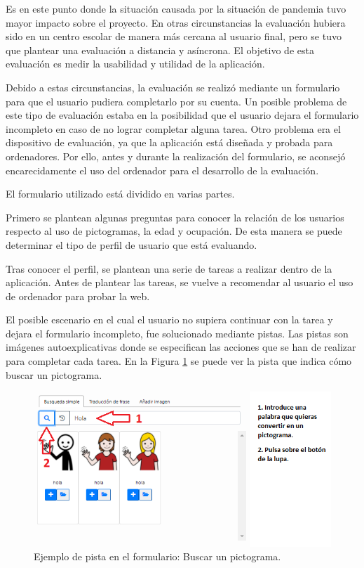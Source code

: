 Es en este punto donde la situación causada por la situación de pandemia tuvo mayor impacto sobre el proyecto. En otras circunstancias la evaluación hubiera sido en un centro escolar de manera más cercana al usuario final, pero se tuvo que plantear una evaluación a distancia y asíncrona. El objetivo de esta evaluación es medir la usabilidad y utilidad de la aplicación. 


Debido a estas circunstancias, la evaluación se realizó mediante un formulario para que el usuario pudiera completarlo por su cuenta. Un posible problema de este tipo de evaluación estaba en la posibilidad que el usuario dejara el formulario incompleto en caso de no lograr completar alguna tarea. Otro problema era el dispositivo de evaluación, ya que la aplicación está diseñada y probada para ordenadores. Por ello, antes y durante la realización del formulario, se aconsejó encarecidamente el uso del ordenador para el desarrollo de la evaluación.

El formulario utilizado está dividido en varias partes.

Primero se plantean algunas preguntas para conocer la relación de los usuarios respecto al uso de pictogramas, la edad y ocupación. De esta manera se puede determinar el tipo de perfil de usuario que está evaluando.

Tras conocer el perfil, se plantean una serie de tareas a realizar dentro de la aplicación. Antes de plantear las tareas, se vuelve a recomendar al usuario el uso de ordenador para probar la web. 

El  posible escenario en el cual el usuario no supiera continuar con la tarea y dejara el formulario incompleto, fue solucionado mediante pistas. Las pistas son imágenes autoexplicativas donde se especifican las acciones que se han de realizar para completar cada tarea. En la Figura \ref{fig:evaPista} se puede ver la pista que indica cómo buscar un pictograma.

\begin{figure}[h!]
	\centering
	\includegraphics[width=0.8\linewidth]{Imagenes/Bitmap/evaluacionPista}
	\caption{ Ejemplo de pista en el formulario: Buscar un pictograma.
	}
	\label{fig:evaPista}
\end{figure} 

